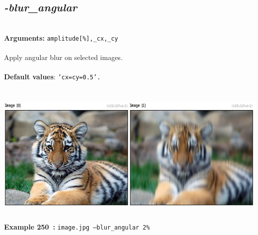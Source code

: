 \documentclass[a4paper,11pt,twoside]{book}
\begin{document}
\subsection{\emph{-blur\_angular} }\vspace*{-0.5em}
~\\\textbf{Arguments: } 
{\small \texttt{amplitude[\%],\_cx,\_cy}}\\~\\
Apply angular blur on selected images.
~\\~\\\textbf{Default values}: {\small \texttt{'cx=cy=0.5'.}}
\begin{center}\includegraphics[keepaspectratio=true,height=7cm,width=\textwidth]{img/gmic_def250.jpg}\\
{\footnotesize \textbf{Example 250~:} \texttt{image.jpg --blur\_angular 2\%}}
\end{center}
\end{document}
